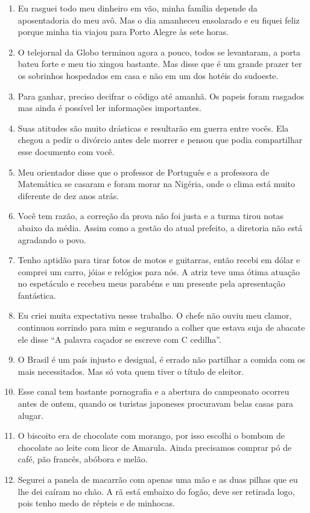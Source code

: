 \begin{enumerate}[itemsep=3pt,parsep=3pt]
    \item Eu rasguei todo meu dinheiro em vão, minha família depende da aposentadoria do meu avô. Mas o dia amanheceu ensolarado e eu fiquei feliz porque minha tia viajou para Porto Alegre às sete horas.
    \item O telejornal da Globo terminou agora a pouco, todos se levantaram, a porta bateu forte e meu tio xingou bastante. Mas disse que é um grande prazer ter os sobrinhos hospedados em casa e não em um dos hotéis do sudoeste.
    \item Para ganhar, preciso decifrar o código até amanhã. Os papeis foram rasgados mas ainda é possível ler informações importantes.
    \item Suas atitudes são muito drásticas e resultarão em guerra entre vocês. Ela chegou a pedir o divórcio antes dele morrer e pensou que podia compartilhar esse documento com você.
    \item Meu orientador disse que o professor de Português e a professora de Matemática se casaram e foram morar na Nigéria, onde o clima está muito diferente de dez anos atrás.
    \item Você tem razão, a correção da prova não foi justa e a turma tirou notas abaixo da média. Assim como a gestão do atual prefeito, a diretoria não está agradando o povo.
    \item Tenho aptidão para tirar fotos de motos e guitarras, então recebi em dólar e comprei um carro, jóias e relógios para nós. A atriz teve uma ótima atuação no espetáculo e recebeu meus parabéns e um presente pela apresentação fantástica.
    \item Eu criei muita expectativa nesse trabalho. O chefe não ouviu meu clamor, continuou sorrindo para mim e segurando a colher que estava suja de abacate ele disse ``A palavra caçador se escreve com C cedilha''.
    \item O Brasil é um país injusto e desigual, é errado não partilhar a comida com os mais necessitados. Mas só vota quem tiver o título de eleitor.
    \item Esse canal tem bastante pornografia e a abertura do campeonato ocorreu antes de ontem, quando os turistas japoneses procuravam belas casas para alugar.
    \item O biscoito era de chocolate com morango, por isso escolhi o bombom de chocolate ao leite com licor de Amarula. Ainda precisamos comprar pó de café, pão francês, abóbora e melão.
    \item Segurei a panela de macarrão com apenas uma mão e as duas pilhas que eu lhe dei caíram no chão. A rã está embaixo do fogão, deve ser retirada logo, pois tenho medo de répteis e de minhocas.

\end{enumerate}
